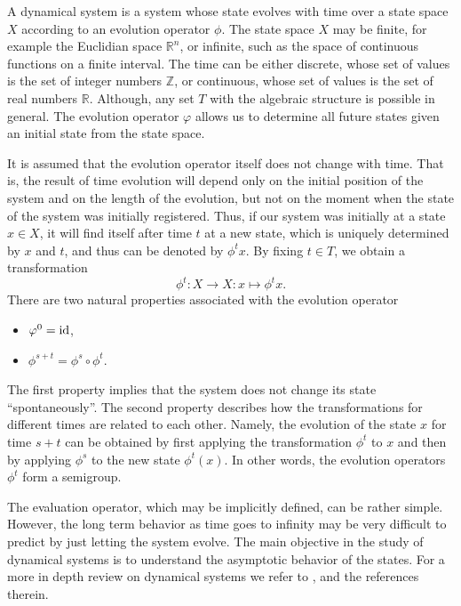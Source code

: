 A dynamical system is a system whose state evolves with time over a state space
$X$ according to an evolution operator $\phi$. The state space $X$ may be finite,
for example the Euclidian space $\mathbb R^n$, or infinite, such as the space of
continuous functions on a finite interval. The time can be either discrete, whose
set of values is the set of integer numbers $\mathbb Z$, or continuous, whose set
of values is the set of real numbers $\mathbb R$. Although, any set $T$ with the
algebraic structure is possible in general. The evolution operator $\varphi$
allows us to determine all future states given an initial state from the state
space.

It is assumed that the evolution operator itself does not change with time.
That is, the result of time evolution will depend only on the initial position
of the system and on the length of the evolution, but not on the moment when
the state of the system was initially registered. Thus, if our system was
initially at a state $x \in X$, it will find itself after time $t$ at a new
state, which is uniquely determined by $x$ and $t$, and thus can be denoted by
$\phi^t x$. By fixing $t\in T$, we obtain a transformation 
\[
    \phi^t \colon X \rightarrow X \colon x \mapsto \phi^t x.
\]
There are two natural properties associated with the evolution operator
\begin{itemize}
    \item $\varphi^0 = \operatorname{id}$,
    \item $\phi^{s+t} = \phi^s \circ \phi^t$.
\end{itemize}
The first property implies that the system does not change its state
``spontaneously''. The second property describes how the transformations for
different times are related to each other. Namely, the evolution of the state
$x$ for time $s + t$ can be obtained by first applying the transformation
$\phi^t$  to $x$ and then by applying $\phi^s$ to the new state $\phi^t(x)$.
In other words, the evolution operators $\phi^t$ form a semigroup. 

The evaluation operator, which may be implicitly defined, can be rather simple.
However, the long term behavior as time goes to infinity may be very difficult to
predict by just letting the system evolve. The main objective in the study of
dynamical systems is to understand the asymptotic behavior of the states. For a
more in depth review on dynamical systems we refer to \cite{Kuznetsov2004}, and
the references therein.

